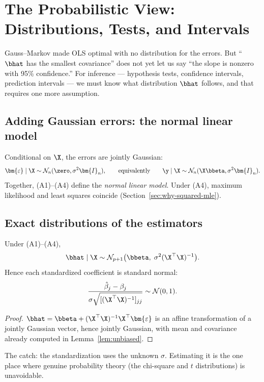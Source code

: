 \section{The Probabilistic View: Distributions, Tests, and Intervals}\label{sec:probability}

Gauss--Markov made OLS optimal with no distribution for the errors. But ``$\bhat$ has the smallest covariance'' does not yet let us say ``the slope is nonzero with 95\% confidence.'' For inference — hypothesis tests, confidence intervals, prediction intervals — we must know what distribution $\bhat$ follows, and that requires one more assumption.

\subsection{Adding Gaussian errors: the normal linear model}

\begin{keybox}[Assumption (A4)]
Conditional on $\X$, the errors are jointly Gaussian:
\[
  \bm{\varepsilon} \mid \X \sim \mathcal{N}_n(\zero, \sigma^2 \bm{I}_n),
  \qquad\text{equivalently}\qquad
  \y \mid \X \sim \mathcal{N}_n(\X \bbeta, \sigma^2 \bm{I}_n).
\]
Together, (A1)--(A4) define the \emph{normal linear model}. Under (A4), maximum likelihood and least squares coincide (Section~\ref{sec:why-squared-mle}).
\end{keybox}

\subsection{Exact distributions of the estimators}

\begin{theorem}\label{thm:dist-bhat}
Under (A1)--(A4),
\[
  \bhat \mid \X \sim \mathcal{N}_{p+1}\big(\bbeta, \; \sigma^2 (\X^\top \X)^{-1}\big).
\]
Hence each standardized coefficient is standard normal:
\[
  \frac{\hat{\beta}_j - \beta_j}{\sigma \sqrt{[(\X^\top\X)^{-1}]_{jj}}} \sim \mathcal{N}(0, 1).
\]
\end{theorem}
\begin{proof}
$\bhat = \bbeta + (\X^\top\X)^{-1}\X^\top \bm{\varepsilon}$ is an affine transformation of a jointly Gaussian vector, hence jointly Gaussian, with mean and covariance already computed in Lemma~\ref{lem:unbiased}.
\end{proof}

The catch: the standardization uses the unknown $\sigma$. Estimating it is the one place where genuine probability theory (the chi-square and $t$ distributions) is unavoidable.

